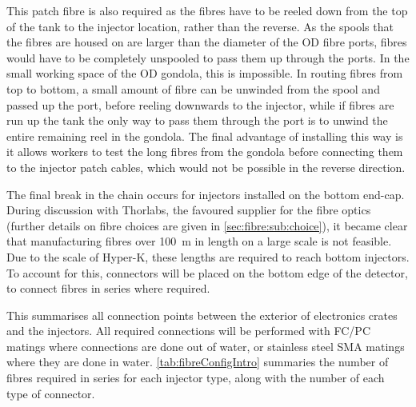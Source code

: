 \documentclass[a4paper,11pt]{article}
\begin{document}
This patch fibre is also required as the fibres have to be reeled down from the top of the tank to the injector location, rather than the reverse. As the spools that the fibres are housed on are larger than the diameter of the OD fibre ports, fibres would have to be completely unspooled to pass them up through the ports. In the small working space of the OD gondola, this is impossible. In routing fibres from top to bottom, a small amount of fibre can be unwinded from the spool and passed up the port, before reeling downwards to the injector, while if fibres are run up the tank the only way to pass them through the port is to unwind the entire remaining reel in the gondola.  The final advantage of installing this way is it allows workers to test the long fibres from the gondola before connecting them to the injector patch cables, which would not be possible in the reverse direction.

The final break in the chain occurs for injectors installed on the bottom end-cap. During discussion with Thorlabs, the favoured supplier for the fibre optics (further details on fibre choices are given in \cref{sec:fibre:sub:choice}), it became clear that manufacturing fibres over 100~m in length on a large scale is not feasible. Due to the scale of Hyper-K, these lengths are required to reach bottom injectors. To account for this, connectors will be placed on the bottom edge of the detector, to connect fibres in series where required.

This summarises all connection points between the exterior of electronics crates and the injectors. All required connections will be performed with FC/PC matings where connections are done out of water, or stainless steel SMA matings where they are done in water. \cref{tab:fibreConfigIntro} summaries the number of fibres required in series for each injector type, along with the number of each type of connector.
\end{document}
